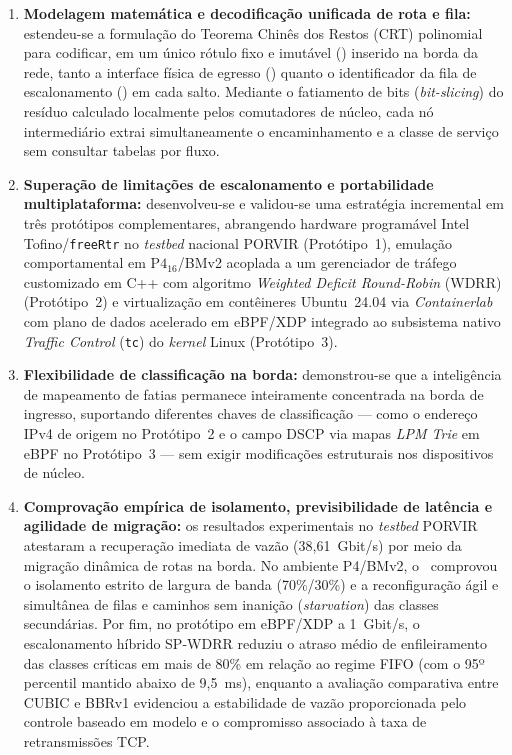 \begin{enumerate}
    \item \textbf{Modelagem matemática e decodificação unificada de rota e fila:} estendeu-se a formulação do Teorema Chinês dos Restos (CRT) polinomial para codificar, em um único rótulo fixo e imutável (\routeID) inserido na borda da rede, tanto a interface física de egresso (\portID) quanto o identificador da fila de escalonamento (\qID) em cada salto. Mediante o fatiamento de bits (\textit{bit-slicing}) do resíduo calculado localmente pelos comutadores de núcleo, cada nó intermediário extrai simultaneamente o encaminhamento e a classe de serviço sem consultar tabelas por fluxo.
    \item \textbf{Superação de limitações de escalonamento e portabilidade multiplataforma:} desenvolveu-se e validou-se uma estratégia incremental em três protótipos complementares, abrangendo hardware programável Intel Tofino/\texttt{freeRtr} no \textit{testbed} nacional PORVIR (Protótipo~1), emulação comportamental em $\text{P4}_{16}$/BMv2 acoplada a um gerenciador de tráfego customizado em C++ com algoritmo \textit{Weighted Deficit Round-Robin} (WDRR) (Protótipo~2) e virtualização em contêineres Ubuntu~24.04 via \textit{Containerlab} com plano de dados acelerado em eBPF/XDP integrado ao subsistema nativo \textit{Traffic Control} (\texttt{tc}) do \textit{kernel} Linux (Protótipo~3).
    \item \textbf{Flexibilidade de classificação na borda:} demonstrou-se que a inteligência de mapeamento de fatias permanece inteiramente concentrada na borda de ingresso, suportando diferentes chaves de classificação --- como o endereço IPv4 de origem no Protótipo~2 e o campo DSCP via mapas \textit{LPM Trie} em eBPF no Protótipo~3 --- sem exigir modificações estruturais nos dispositivos de núcleo.
    \item \textbf{Comprovação empírica de isolamento, previsibilidade de latência e agilidade de migração:} os resultados experimentais no \textit{testbed} PORVIR atestaram a recuperação imediata de vazão (38,61~Gbit/s) por meio da migração dinâmica de rotas na borda. No ambiente P4/BMv2, o \nome\ comprovou o isolamento estrito de largura de banda (70\%/30\%) e a reconfiguração ágil e simultânea de filas e caminhos sem inanição (\textit{starvation}) das classes secundárias. Por fim, no protótipo em eBPF/XDP a 1~Gbit/s, o escalonamento híbrido SP-WDRR reduziu o atraso médio de enfileiramento das classes críticas em mais de 80\% em relação ao regime FIFO (com o 95º percentil mantido abaixo de 9,5~ms), enquanto a avaliação comparativa entre CUBIC e BBRv1 evidenciou a estabilidade de vazão proporcionada pelo controle baseado em modelo e o compromisso associado à taxa de retransmissões TCP.
\end{enumerate}


